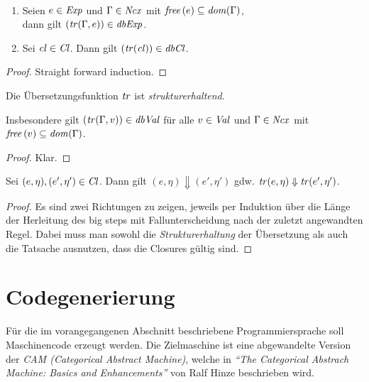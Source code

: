 \documentclass[12pt,fleqn]{article}
\newcommand{\Cl}{\name{Cl}}
\newcommand{\cl}{\name{cl}}
\begin{document}
\begin{lemma} \
  \begin{enumerate}
  \item Seien $e \in {\text{\it Exp\/}}$ und $\Gamma\in{\text{\it Ncx\/}}$ mit ${\text{\it free\/}}\,(e)\subseteq {\text{\it dom\/}}(\Gamma)$, \\
    dann gilt $({\text{\it tr\/}}(\Gamma,e))\in{\text{\it dbExp\/}}$.
  \item Sei $\cl\in\Cl$. Dann gilt $(\tr{\cl})\in\dbCl$.
  \end{enumerate}
\end{lemma}

\begin{proof}
  Straight forward induction.
\end{proof}

\begin{lemma}
  Die \"Ubersetzungsfunktion ${\text{\it tr\/}}$ ist {\em strukturerhaltend}.
\end{lemma}

Insbesondere gilt $({\text{\it tr\/}}(\Gamma,v))\in{\text{\it dbVal\/}}$ f\"ur alle $v\in{\text{\it Val\/}}$ und $\Gamma\in{\text{\it Ncx\/}}$ mit
${\text{\it free\/}}\,(v)\subseteq{\text{\it dom\/}}(\Gamma)$.

\begin{proof}
  Klar.
\end{proof}

\begin{theorem}[\"Aquivalenzsatz]
  Sei $(e,\eta),(e',\eta')\in\Cl$. Dann gilt $(e,\eta) \Downarrow (e',\eta')$ gdw.
  ${\text{\it tr\/}}(e,\eta) \Downarrow {\text{\it tr\/}}(e',\eta')$.
\end{theorem}

\begin{proof}
  Es sind zwei Richtungen zu zeigen, jeweils per Induktion \"uber die L\"ange der Herleitung des big steps mit
  Fallunterscheidung nach der zuletzt angewandten Regel. Dabei muss man sowohl die {\em Strukturerhaltung} der
  \"Ubersetzung als auch die Tatsache ausnutzen, dass die Closures g\"ultig sind.
\end{proof}


\section{Codegenerierung}

F\"ur die im vorangegangenen Abschnitt beschriebene Programmiersprache soll Maschinencode erzeugt werden. Die
Zielmaschine ist eine abgewandelte Version der {\em CAM (Categorical Abstract Machine)}, welche in {\em ``The
Categorical Abstrach Machine: Basics and Enhancements''} von Ralf Hinze beschrieben wird.
\end{document}
